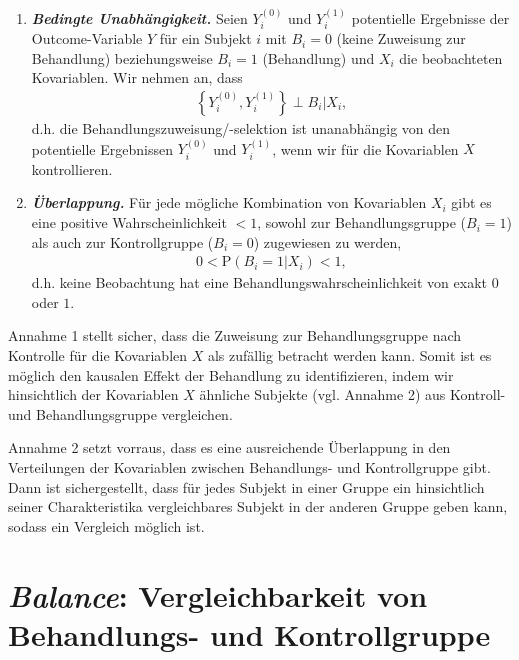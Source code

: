 \documentclass[
  a4paper,
  DIV=11,
  oneside]{scrreprt}
\begin{document}
\begin{enumerate}
\def\labelenumi{\arabic{enumi}.}
\item
  \textbf{\emph{Bedingte Unabhängigkeit.}} Seien \(Y^{(0)}_i\) und
  \(Y^{(1)}_i\) potentielle Ergebnisse der Outcome-Variable \(Y\) für
  ein Subjekt \(i\) mit \(B_i=0\) (keine Zuweisung zur Behandlung)
  beziehungsweise \(B_i=1\) (Behandlung) und \(X_i\) die beobachteten
  Kovariablen. Wir nehmen an, dass \begin{align}
    \left\{Y^{(0)}_i, Y^{(1)}_i\right\} \perp B_i\vert X_i, \label{eq:cia}
  \end{align} d.h. die Behandlungszuweisung/-selektion ist unanabhängig
  von den potentielle Ergebnissen \(Y^{(0)}_i\) und \(Y^{(1)}_i\), wenn
  wir für die Kovariablen \(X\) kontrollieren.
\item
  \textbf{\emph{Überlappung.}} Für jede mögliche Kombination von
  Kovariablen \(X_i\) gibt es eine positive Wahrscheinlichkeit \(<1\),
  sowohl zur Behandlungsgruppe (\(B_i = 1\)) als auch zur Kontrollgruppe
  (\(B_i = 0\)) zugewiesen zu werden, \begin{align}
    0 < \text{P}(B_i=1\lvert X_i) < 1, \label{eq:overlap}
  \end{align} d.h. keine Beobachtung hat eine
  Behandlungswahrscheinlichkeit von exakt \(0\) oder \(1\).
\end{enumerate}

Annahme 1 stellt sicher, dass die Zuweisung zur Behandlungsgruppe nach
Kontrolle für die Kovariablen \(X\) als zufällig betracht werden kann.
Somit ist es möglich den kausalen Effekt der Behandlung zu
identifizieren, indem wir hinsichtlich der Kovariablen \(X\) ähnliche
Subjekte (vgl. Annahme 2) aus Kontroll- und Behandlungsgruppe
vergleichen.

Annahme 2 setzt vorraus, dass es eine ausreichende Überlappung in den
Verteilungen der Kovariablen zwischen Behandlungs- und Kontrollgruppe
gibt. Dann ist sichergestellt, dass für jedes Subjekt in einer Gruppe
ein hinsichtlich seiner Charakteristika vergleichbares Subjekt in der
anderen Gruppe geben kann, sodass ein Vergleich möglich ist.

\section{\texorpdfstring{\emph{Balance}: Vergleichbarkeit von
Behandlungs- und
Kontrollgruppe}{Balance: Vergleichbarkeit von Behandlungs- und Kontrollgruppe}}\label{sec-balance}
\end{document}
